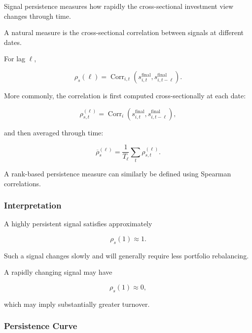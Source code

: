 \documentclass[11pt,a4paper]{article}
\begin{document}
Signal persistence measures how rapidly the cross-sectional investment view
changes through time.

A natural measure is the cross-sectional correlation between signals at
different dates.

For lag $\ell$,

\begin{equation}
\boxed{
\rho_s(\ell)
=
\operatorname{Corr}_{i,t}
\left(
s_{i,t}^{\mathrm{final}},
s_{i,t-\ell}^{\mathrm{final}}
\right).
}
\end{equation}

More commonly, the correlation is first computed cross-sectionally at each
date:

\begin{equation}
\rho_{s,t}^{(\ell)}
=
\operatorname{Corr}_i
\left(
s_{i,t}^{\mathrm{final}},
s_{i,t-\ell}^{\mathrm{final}}
\right),
\end{equation}

and then averaged through time:

\begin{equation}
\boxed{
\overline{\rho}_s^{(\ell)}
=
\frac{1}{T_\ell}
\sum_t
\rho_{s,t}^{(\ell)}.
}
\end{equation}

A rank-based persistence measure can similarly be defined using Spearman
correlations.


\subsubsection{Interpretation}

A highly persistent signal satisfies approximately

\begin{equation}
\rho_s(1)
\approx 1.
\end{equation}

Such a signal changes slowly and will generally require less portfolio
rebalancing.

A rapidly changing signal may have

\begin{equation}
\rho_s(1)
\approx 0,
\end{equation}

which may imply substantially greater turnover.


\subsubsection{Persistence Curve}
\end{document}
